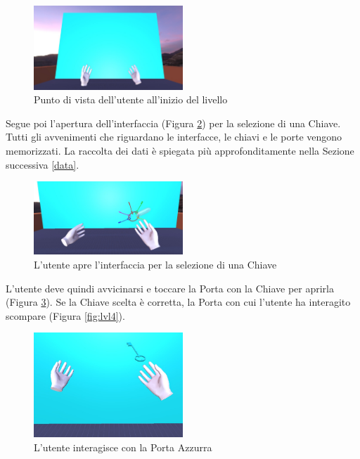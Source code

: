 \documentclass[target=bach,aauheader=]{thud}
\begin{document}
\begin{figure}[h]
    \centering
    \includegraphics[width=0.50\textwidth]{lvl1}
    \caption{Punto di vista dell'utente all'inizio del livello}
    \label{fig:lvl1}
\end{figure}

\newpage
Segue poi l'apertura dell'interfaccia (Figura \ref{fig:lvl2}) per la selezione di una Chiave.
Tutti gli avvenimenti che riguardano le interfacce, le chiavi e le porte vengono memorizzati.
La raccolta dei dati è spiegata più approfonditamente nella Sezione successiva \ref{data}. \\

\begin{figure}[h]
    \centering
    \includegraphics[width=0.50\textwidth]{lvl2}
    \caption{L'utente apre l'interfaccia per la selezione di una Chiave }
    \label{fig:lvl2}
\end{figure}

L'utente deve quindi avvicinarsi e toccare la Porta con la Chiave per aprirla (Figura \ref{fig:lvl3}).
Se la Chiave scelta è corretta, la Porta con cui l'utente ha interagito scompare (Figura \ref{fig:lvl4}). \\

\begin{figure}[h]
    \centering
    \includegraphics[width=0.50\textwidth]{lvl3}
    \caption{L'utente interagisce con la Porta Azzurra}
    \label{fig:lvl3}
\end{figure}
\end{document}
